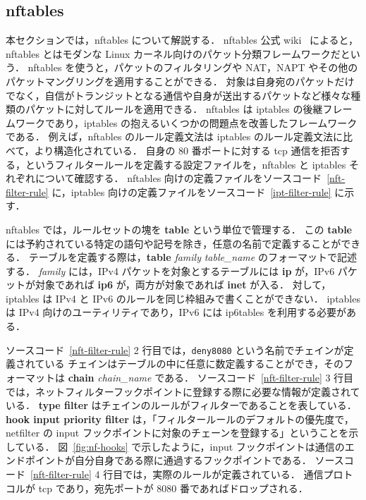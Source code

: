 \subsection{nftables}
\label{ssec:thru-chains.nftables}
本セクションでは，nftables について解説する．
nftables 公式 wiki~\cite{about-nftables} によると，nftables とはモダンな Linux カーネル向けのパケット分類フレームワークだという．
nftables を使うと，パケットのフィルタリングや NAT，NAPT やその他のパケットマングリングを適用することができる．
対象は自身宛のパケットだけでなく，自信がトランジットとなる通信や自身が送出するパケットなど様々な種類のパケットに対してルールを適用できる．
nftables は iptables の後継フレームワークであり，iptables の抱えるいくつかの問題点を改善したフレームワークである．
例えば，nftables のルール定義文法は iptables のルール定義文法に比べて，より構造化されている．
自身の 80 番ポートに対する tcp 通信を拒否する，というフィルタールールを定義する設定ファイルを，nftables と iptables それぞれについて確認する．
nftables 向けの定義ファイルをソースコード~\ref*{nft-filter-rule} に，iptables 向けの定義ファイルをソースコード~\ref*{ipt-filter-rule} に示す．

nftables では，ルールセットの塊を \textbf{table} という単位で管理する．
この \textbf{table} には予約されている特定の語句や記号を除き，任意の名前で定義することができる．
テーブルを定義する際は，\textbf{table} \textit{family} \textit{table\_name} のフォーマットで記述する．
\textit{family} には，IPv4 パケットを対象とするテーブルには \textbf{ip} が，IPv6 パケットが対象であれば \textbf{ip6} が，両方が対象であれば  \textbf{inet} が入る．
対して，iptables は IPv4 と IPv6 のルールを同じ枠組みで書くことができない．
iptables は IPv4 向けのユーティリティであり，IPv6 には ip6tables を利用する必要がある．

ソースコード~\ref*{nft-filter-rule} 2 行目では，\texttt{deny8080} という名前でチェインが定義されている
チェインはテーブルの中に任意に数定義することができ，そのフォーマットは \textbf{chain} \textit{chain\_name} である．
ソースコード~\ref*{nft-filter-rule} 3 行目では，ネットフィルターフックポイントに登録する際に必要な情報が定義されている．
\textbf{type filter} はチェインのルールがフィルターであることを表している．
\textbf{hook input priority filter} は，「フィルタールールのデフォルトの優先度で，netfilter の input フックポイントに対象のチェーンを登録する」ということを示している．
図~\ref{fig:nf-hooks} で示したように，input フックポイントは通信のエンドポイントが自分自身である際に通過するフックポイントである．
ソースコード~\ref*{nft-filter-rule} 4 行目では，実際のルールが定義されている．
通信プロトコルが tcp であり，宛先ポートが 8080 番であればドロップされる．

